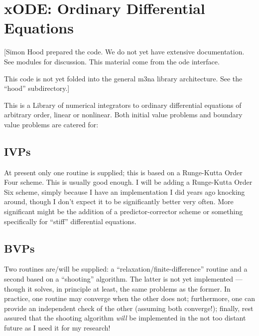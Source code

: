 \section{xODE: Ordinary Differential Equations}

[Simon Hood prepared the code.  We do not yet have extensive
documentation.  See modules for discussion.  This material come from
the ode interface.

This code is not yet folded into the general m3na library architecture.
See the ``hood'' subdirectory.]

This is a Library of numerical integrators to
ordinary differential equations of arbitrary order, linear or nonlinear.
Both initial value problems and
  boundary value problems are catered for:

\subsection*{IVPs}
At present only one routine is supplied;  this is based on a 
      Runge-Kutta Order Four scheme.  This is usually good enough.  I will
      be adding a Runge-Kutta Order Six scheme, simply because I have an
      implementation I did years ago knocking around, though I don't expect
      it to be significantly better very often.  More significant might be
      the addition of a predictor-corrector scheme or something specifically
      for ``stiff'' differential equations.

\subsection*{BVPs}
Two routines are/will be supplied:  
      a ``relaxation/finite-difference''
      routine and a second based on a ``shooting'' algorithm.  The latter
      is not yet implemented --- though it solves, in principle at least, 
      the same problems as the former.  In practice, one routine may converge
      when the other does not;  furthermore, one can provide an 
      independent check of the other (assuming both converge!);  finally,
      rest assured that the shooting algorithm {\it will\/} be implemented
      in the not too distant future as I need it for my research!


